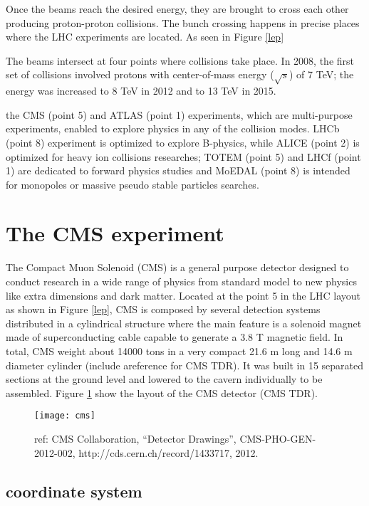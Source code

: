 Once the beams reach the desired energy, they are brought to cross each other producing proton-proton collisions. The bunch crossing happens in precise places where the LHC experiments are located. As seen in Figure \ref{lep}

The beams intersect at four points where collisions take place. In 2008, the first set of collisions involved protons with center-of-mass energy ($\sqrt{s}$) of 7 TeV; the energy was increased to 8 TeV in 2012 and to 13 TeV in 2015.



 the CMS (point 5) and ATLAS (point 1) experiments, which are multi-purpose experiments, enabled to explore physics in any of the collision modes. LHCb (point 8) experiment is optimized to explore B-physics, while ALICE (point 2) is optimized for heavy ion collisions researches; TOTEM (point 5) and LHCf (point 1) are dedicated to forward physics studies and MoEDAL (point 8) is intended for monopoles or massive pseudo stable particles searches.


\section{The CMS experiment}

The Compact Muon Solenoid (CMS) is a general purpose detector designed to conduct research in a wide range of physics from standard model to new physics like extra dimensions and dark matter. Located at the point 5 in the LHC layout as shown in Figure \ref{lep}, CMS is composed by several detection systems distributed in a cylindrical structure where the main feature is a solenoid magnet made of superconducting cable capable to generate a 3.8 T magnetic field. In total, CMS weight about 14000 tons in a very compact 21.6 m long and 14.6 m diameter cylinder (include areference for CMS TDR). It was built in 15 separated sections at the ground level and lowered to the cavern individually to be assembled. Figure \ref{cms} show the layout of the CMS detector (CMS TDR).          

\begin{figure}[!h]
  \centering
  \texttt{[image: cms]}
  \caption {ref: CMS Collaboration, ``Detector Drawings'', CMS-PHO-GEN-2012-002, http://cds.cern.ch/record/1433717, 2012. }\label{cms}
\end{figure}


\subsection{coordinate system }
